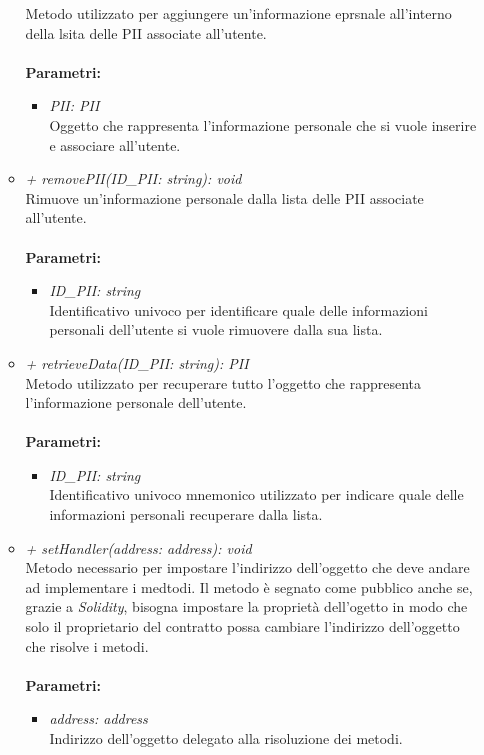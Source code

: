 \begin{itemize}
\begin{itemize}
		Metodo utilizzato per aggiungere un'informazione eprsnale all'interno della lsita delle \gls{PII} associate all'utente.\\\\
		\textbf{Parametri:}
		\begin{itemize}
			\item \textit{PII: PII}\\
			Oggetto che rappresenta l'informazione personale che si vuole inserire e associare all'utente.
		\end{itemize}
		\item \textit{+ removePII(ID\_PII: string): void}\\
		Rimuove un'informazione personale dalla lista delle \gls{PII} associate all'utente.\\\\
		\textbf{Parametri:}
		\begin{itemize}
			\item \textit{ID\_PII: string}\\
			Identificativo univoco per identificare quale delle informazioni personali dell'utente si vuole rimuovere dalla sua lista.
		\end{itemize}
		\item \textit{+ retrieveData(ID\_PII: string): PII}\\
		Metodo utilizzato per recuperare tutto l'oggetto che rappresenta l'informazione personale dell'utente.\\\\
		\textbf{Parametri:}
		\begin{itemize}
			\item \textit{ID\_PII: string}\\
			Identificativo univoco mnemonico utilizzato per indicare quale delle informazioni personali recuperare dalla lista.
		\end{itemize}
		\item \textit{+ setHandler(address: address): void}\\
		Metodo necessario per impostare l'indirizzo dell'oggetto che deve andare ad implementare i medtodi. Il metodo è segnato come pubblico anche se, grazie a \textit{Solidity}, bisogna impostare la proprietà dell'ogetto in modo che solo il proprietario del contratto possa cambiare l'indirizzo dell'oggetto che risolve i metodi.\\\\
		\textbf{Parametri:}
		\begin{itemize}
			\item \textit{address: address}\\
			Indirizzo dell'oggetto delegato alla risoluzione dei metodi.
		\end{itemize}
	\end{itemize}
\end{itemize}
